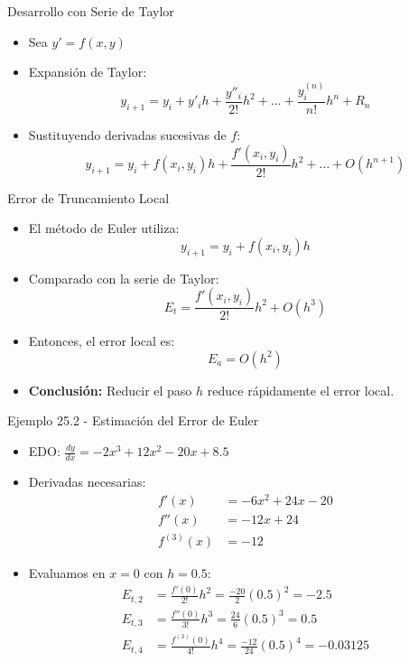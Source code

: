\documentclass[main.tex]{subfiles}
\begin{document}
\begin{frame}{\small Desarrollo con Serie de Taylor}
\begin{itemize}
  \item Sea \( y' = f(x, y) \)
  \item Expansi\'on de Taylor:
  \[
    y_{i+1} = y_i + y'_i h + \frac{y''_i}{2!}h^2 + \dots + \frac{y^{(n)}_i}{n!}h^n + R_n
  \]
  \item Sustituyendo derivadas sucesivas de $f$:
  \[
    y_{i+1} = y_i + f(x_i, y_i)h + \frac{f'(x_i, y_i)}{2!}h^2 + \dots + O(h^{n+1})
  \]
\end{itemize}
\end{frame}

\begin{frame}{\small Error de Truncamiento Local}
\begin{itemize}
  \item El m\'etodo de Euler utiliza:
  \[
    y_{i+1} = y_i + f(x_i, y_i)h
  \]
  \item Comparado con la serie de Taylor:
  \[
    E_t = \frac{f'(x_i, y_i)}{2!}h^2 + O(h^3)
  \]
  \item Entonces, el error local es:
  \[
    E_a = O(h^2)
  \]
  \item \textbf{Conclusi\'on:} Reducir el paso $h$ reduce r\'apidamente el error local.
\end{itemize}
\end{frame}

\begin{frame}{\small Ejemplo 25.2 - Estimaci\'on del Error de Euler}
\begin{itemize}
  \item EDO: \( \frac{dy}{dx} = -2x^3 + 12x^2 - 20x + 8.5 \)
  \item Derivadas necesarias:
  \begin{align*}
    f'(x) &= -6x^2 + 24x - 20 \\
    f''(x) &= -12x + 24 \\
    f^{(3)}(x) &= -12
  \end{align*}
  \item Evaluamos en $x=0$ con $h=0.5$:
  \begin{align*}
    E_{t,2} &= \frac{f'(0)}{2!} h^2 = \frac{-20}{2} (0.5)^2 = -2.5 \\
    E_{t,3} &= \frac{f''(0)}{3!} h^3 = \frac{24}{6} (0.5)^3 = 0.5 \\
    E_{t,4} &= \frac{f^{(3)}(0)}{4!} h^4 = \frac{-12}{24} (0.5)^4 = -0.03125
  \end{align*}
\end{itemize}
\end{frame}
\end{document}
